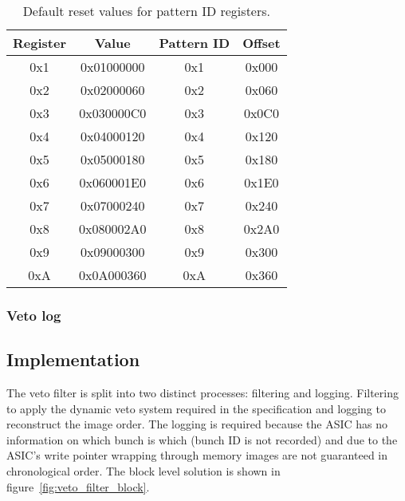\documentclass[]{article}
\begin{document}
    \begin{table}
        \begin{center}
            \begin{tabular}{c|c|c|c}
                Register & Value      & Pattern ID & Offset \\
                \hline
                0x1      & 0x01000000 & 0x1        & 0x000  \\ 
                0x2      & 0x02000060 & 0x2        & 0x060  \\  
                0x3      & 0x030000C0 & 0x3        & 0x0C0  \\ 
                0x4      & 0x04000120 & 0x4        & 0x120  \\ 
                0x5      & 0x05000180 & 0x5        & 0x180  \\ 
                0x6      & 0x060001E0 & 0x6        & 0x1E0  \\ 
                0x7      & 0x07000240 & 0x7        & 0x240  \\ 
                0x8      & 0x080002A0 & 0x8        & 0x2A0  \\ 
                0x9      & 0x09000300 & 0x9        & 0x300  \\ 
                0xA      & 0x0A000360 & 0xA        & 0x360  \\ 
            \end{tabular}
        \end{center}
        \caption{Default reset values for pattern ID registers.}
        \label{tab:default_pattern_id_reg}
    \end{table}
    \subsubsection{Veto log} %
    \label{sub:veto_locallink}
    \subsection{Implementation} %
    \label{sub:veto_implementation}
    The veto filter is split into two distinct processes: filtering and logging. Filtering to apply the dynamic veto system required in the specification and logging to reconstruct the image order. The logging is required because the ASIC has no information on which bunch is which (bunch ID is not recorded) and due to the ASIC's write pointer wrapping through memory images are not guaranteed in chronological order. The block level solution is shown in figure~\ref{fig:veto_filter_block}.
    
\end{document}
